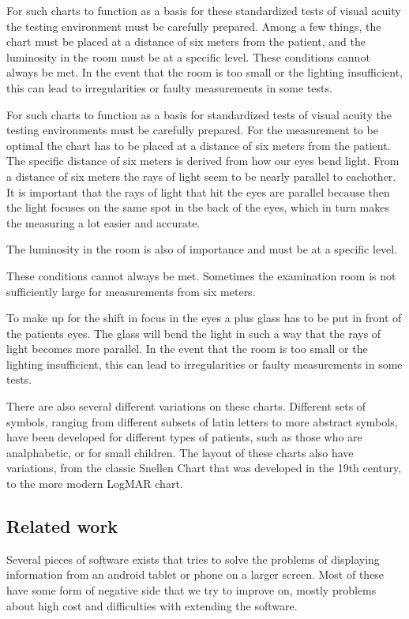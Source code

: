 \documentclass[12pt,a4paper,notitlepage]{report}
\begin{document}
For such charts to function as a basis for these standardized tests of visual acuity the testing environment must be carefully prepared. Among a few things, the chart must be placed at a distance of six meters from the patient, and the luminosity in the room must be at a specific level. These conditions cannot always be met. In the event that the room is too small or the lighting insufficient, this can lead to irregularities or faulty measurements in some tests. 

For such charts to function as a basis for standardized tests of visual acuity the testing environments must be carefully prepared. For the measurement to be optimal the chart has to be placed at a distance of six meters from the patient. The specific distance of six meters is derived from how our eyes bend light. From a distance of six meters the rays of light seem to be nearly parallel to eachother. %
It is important that the rays of light that hit the eyes are parallel because then the light focuses on the same spot in the back of the eyes, which in turn makes the measuring a lot easier and accurate. 

The luminosity in the room is also of importance and must be at a specific level. 

These conditions cannot always be met. Sometimes the examination room is not sufficiently large for measurements from six meters. %

To make up for the shift in focus in the eyes a plus glass has to be put in front of the patients eyes. The glass will bend the light in such a way that the rays of light becomes more parallel. In the event that the room is too small or the lighting insufficient, this can lead to irregularities or faulty measurements in some tests. 

There are also several different variations on these charts. Different sets of symbols, ranging from different subsets of latin letters to more abstract symbols, have been developed for different types of patients, such as those who are analphabetic, or for small children. The layout of these charts also have variations, from the classic Snellen Chart that was developed in the 19th century, to the more modern LogMAR chart.

\subsection{Related work}
Several pieces of software exists that tries to solve the problems of displaying information from an android tablet or phone on a larger screen. Most of these have some form of negative side that we try to improve on, mostly problems about high cost and difficulties with extending the software.
\end{document}
